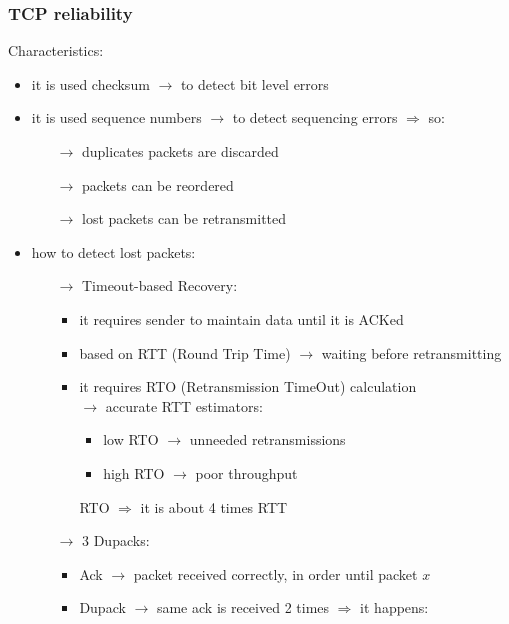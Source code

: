 \subsubsection{TCP reliability}
Characteristics:
\begin{itemize}
    \item it is used checksum $\rightarrow$ to detect bit level errors
    \item it is used sequence numbers $\rightarrow$ to detect sequencing errors
    $\Rightarrow$ so:
    \begin{itemize}
        \item[$\rightarrow$] duplicates packets are discarded
        \item[$\rightarrow$] packets can be reordered
        \item[$\rightarrow$] lost packets can be retransmitted
    \end{itemize}
    \item how to detect lost packets:
    \begin{itemize}
        \item[$\rightarrow$] Timeout-based Recovery:
        \begin{itemize}
            \item it requires sender to maintain data until it is ACKed
            \item based on RTT (Round Trip Time) $\rightarrow$ waiting before retransmitting
            \item it requires RTO (Retransmission TimeOut) calculation\\$\rightarrow$ accurate RTT estimators:
            \begin{itemize}
                \item low RTO $\rightarrow$ unneeded retransmissions
                \item high RTO $\rightarrow$ poor throughput
            \end{itemize}
            RTO $\Rightarrow$ it is about 4 times RTT
        \end{itemize}
        \item[$\rightarrow$] 3 Dupacks:
        \begin{itemize}
            \item Ack $\rightarrow$ packet received correctly, in order until packet $x$
            \item Dupack $\rightarrow$ same ack is received 2 times $\Rightarrow$ it happens:
            \begin{itemize}

\end{itemize}
\end{itemize}
\end{itemize}
\end{itemize}
